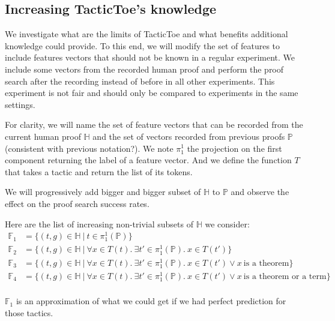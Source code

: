 \documentclass[runningheads,a4paper,draft]{svjour3}
\def\tactictoe{\textsf{TacticToe}\xspace}
\begin{document}
\subsection{Increasing \tactictoe's knowledge}\label{sec:perfect_exp}


We investigate what are the limits of \tactictoe and what benefits additional 
knowledge could provide. To this end, we will modify the set of features to 
include features vectors that should not be known in a regular experiment. We  
include some vectors from the recorded human proof and perform the proof 
search 
after the recording instead of before in all other experiments. This 
experiment 
is not fair and should only be compared to 
experiments in the same settings.

For clarity, we will name the set of feature vectors that can be recorded from 
the current human proof $\mathbb{H}$ and the set of vectors recorded from 
previous proofs $\mathbb{P}$ (consistent with previous notation?). We note 
$\pi_1^1$ the projection on the 
first component returning the label of a feature vector. And we define the 
function $T$ that takes a tactic and return the list of its tokens.

We will progressively add bigger and bigger 
subset of $\mathbb{H}$ to $\mathbb{P}$ and observe the effect on the proof 
search success rates. 

Here are the list of increasing non-trivial subsets of $\mathbb{H}$ we 
consider:
\begin{align*}
\mathbb{F}_1 &= \lbrace (t,g) \in \mathbb{H}\ |\ t \in \pi_1^1(\mathbb{P})  
   \rbrace \\
\mathbb{F}_2 &= \lbrace (t,g) \in \mathbb{H}\ |\ \forall x \in T(t).\ \exists 
t'\in \pi_1^1(\mathbb{P}).\ x \in T(t') \rbrace\\
\mathbb{F}_3 &= \lbrace (t,g) \in \mathbb{H}\ |\ \forall x \in T(t).\ \exists 
t'\in \pi_1^1(\mathbb{P}).\ x \in T(t') \vee x\ \mbox{is a theorem} \rbrace\\
\mathbb{F}_4 &= \lbrace (t,g) \in \mathbb{H}\ |\ \forall x \in T(t).\ \exists 
t'\in \pi_1^1(\mathbb{P}).\ x \in T(t') \vee x\ \mbox{is a theorem or a term} 
\rbrace\\
\end{align*}


$\mathbb{F}_1$ is an approximation of what we could get if we had perfect 
prediction for those tactics.
\end{document}
